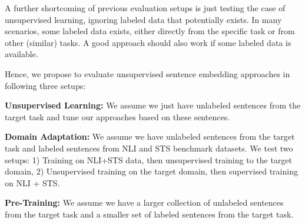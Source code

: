 \documentclass[11pt]{article}
\begin{document}
A further shortcoming of previous evaluation setups is just testing the case of unsupervised learning, ignoring labeled data that potentially exists. In many scenarios, some labeled data exists, either directly from the specific task or from other (similar) tasks. A good approach should also work if some labeled data is available.

Hence, we propose to evaluate unsupervised sentence embedding approaches in following three setups:

\textbf{Unsupervised Learning:} We assume we just have unlabeled sentences from the target task and tune our approaches based on these sentences.

\textbf{Domain Adaptation:} We assume we have unlabeled sentences from the target task and labeled sentences from NLI \cite{DBLP:conf/emnlp/BowmanAPM15, DBLP:conf/naacl/WilliamsNB18} and STS benchmark \cite{cer-etal-2017-semeval} datasets. We test two setups: 1) Training on NLI+STS data, then unsupervised training to the target domain, 2) Unsupervised training on the target domain, then supervised training on NLI + STS.

\textbf{Pre-Training:} We assume we have a larger collection of unlabeled sentences from the target task and a smaller set of labeled sentences from the target task.
\end{document}
